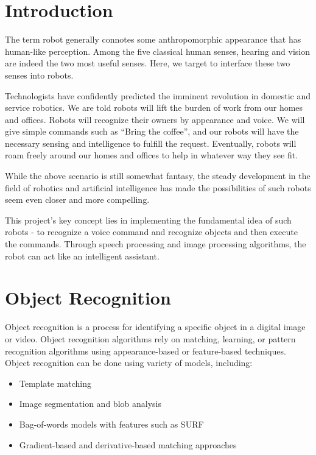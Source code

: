 \documentclass[journal,twoside]{IEEEtran}
\begin{document}
\section{Introduction}

The term robot generally connotes some anthropomorphic
appearance that has human-like perception. Among the
five classical human senses, hearing and vision are indeed the
two most useful senses. Here, we target to interface these two
senses into robots.

Technologists have confidently predicted the imminent
revolution in domestic and service robotics. We are told robots
will lift the burden of work from our homes and offices.
Robots will recognize their owners by appearance and voice.
We will give simple commands such as “Bring the coffee”,
and our robots will have the necessary sensing and intelligence
to fulfill the request. Eventually, robots will roam freely
around our homes and offices to help in whatever way they
see fit.

While the above scenario is still somewhat fantasy, the
steady development in the field of robotics and artificial
intelligence has made the possibilities of such robots seem
even closer and more compelling.

This project’s key concept lies in implementing the
fundamental idea of such robots - to recognize a voice
command and recognize objects and then execute the
commands. Through speech processing and image processing
algorithms, the robot can act like an intelligent assistant.

\section{Object Recognition}

Object recognition is a process for identifying a specific
object in a digital image or video. Object recognition
algorithms rely on matching, learning, or pattern recognition
algorithms using appearance-based or feature-based
techniques. Object recognition can be done using variety of
models, including:

\begin{itemize}
    \item Template matching \cite{Ahuja2013}
    \item Image segmentation and blob analysis \cite{Jia2008}
    \item Bag-of-words models with features such as SURF \cite{Schmitt2011}
    \item Gradient-based and derivative-based matching approaches \cite{Lecun1999}
\end{itemize}
\end{document}
